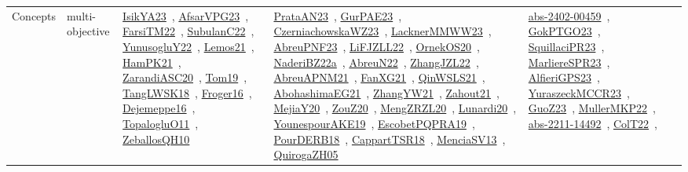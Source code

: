 {\begin{longtable}{lp{3cm}>{\raggedright\arraybackslash}p{6cm}>{\raggedright\arraybackslash}p{6cm}>{\raggedright\arraybackslash}p{8cm}}
Concepts & multi-objective & \href{../works/IsikYA23.pdf}{IsikYA23}~\cite{IsikYA23}, \href{../works/AfsarVPG23.pdf}{AfsarVPG23}~\cite{AfsarVPG23}, \href{../works/FarsiTM22.pdf}{FarsiTM22}~\cite{FarsiTM22}, \href{../works/SubulanC22.pdf}{SubulanC22}~\cite{SubulanC22}, \href{../works/YunusogluY22.pdf}{YunusogluY22}~\cite{YunusogluY22}, \href{../works/Lemos21.pdf}{Lemos21}~\cite{Lemos21}, \href{../works/HamPK21.pdf}{HamPK21}~\cite{HamPK21}, \href{../works/ZarandiASC20.pdf}{ZarandiASC20}~\cite{ZarandiASC20}, \href{../works/Tom19.pdf}{Tom19}~\cite{Tom19}, \href{../works/TangLWSK18.pdf}{TangLWSK18}~\cite{TangLWSK18}, \href{../works/Froger16.pdf}{Froger16}~\cite{Froger16}, \href{../works/Dejemeppe16.pdf}{Dejemeppe16}~\cite{Dejemeppe16}, \href{../works/TopalogluO11.pdf}{TopalogluO11}~\cite{TopalogluO11}, \href{../works/ZeballosQH10.pdf}{ZeballosQH10}~\cite{ZeballosQH10} & \href{../works/PrataAN23.pdf}{PrataAN23}~\cite{PrataAN23}, \href{../works/GurPAE23.pdf}{GurPAE23}~\cite{GurPAE23}, \href{../works/CzerniachowskaWZ23.pdf}{CzerniachowskaWZ23}~\cite{CzerniachowskaWZ23}, \href{../works/LacknerMMWW23.pdf}{LacknerMMWW23}~\cite{LacknerMMWW23}, \href{../works/AbreuPNF23.pdf}{AbreuPNF23}~\cite{AbreuPNF23}, \href{../works/LiFJZLL22.pdf}{LiFJZLL22}~\cite{LiFJZLL22}, \href{../works/OrnekOS20.pdf}{OrnekOS20}~\cite{OrnekOS20}, \href{../works/NaderiBZ22a.pdf}{NaderiBZ22a}~\cite{NaderiBZ22a}, \href{../works/AbreuN22.pdf}{AbreuN22}~\cite{AbreuN22}, \href{../works/ZhangJZL22.pdf}{ZhangJZL22}~\cite{ZhangJZL22}, \href{../works/AbreuAPNM21.pdf}{AbreuAPNM21}~\cite{AbreuAPNM21}, \href{../works/FanXG21.pdf}{FanXG21}~\cite{FanXG21}, \href{../works/QinWSLS21.pdf}{QinWSLS21}~\cite{QinWSLS21}, \href{../works/AbohashimaEG21.pdf}{AbohashimaEG21}~\cite{AbohashimaEG21}, \href{../works/ZhangYW21.pdf}{ZhangYW21}~\cite{ZhangYW21}, \href{../works/Zahout21.pdf}{Zahout21}~\cite{Zahout21}, \href{../works/MejiaY20.pdf}{MejiaY20}~\cite{MejiaY20}, \href{../works/ZouZ20.pdf}{ZouZ20}~\cite{ZouZ20}, \href{../works/MengZRZL20.pdf}{MengZRZL20}~\cite{MengZRZL20}, \href{../works/Lunardi20.pdf}{Lunardi20}~\cite{Lunardi20}, \href{../works/YounespourAKE19.pdf}{YounespourAKE19}~\cite{YounespourAKE19}, \href{../works/EscobetPQPRA19.pdf}{EscobetPQPRA19}~\cite{EscobetPQPRA19}, \href{../works/PourDERB18.pdf}{PourDERB18}~\cite{PourDERB18}, \href{../works/CappartTSR18.pdf}{CappartTSR18}~\cite{CappartTSR18}, \href{../works/MenciaSV13.pdf}{MenciaSV13}~\cite{MenciaSV13}, \href{../works/QuirogaZH05.pdf}{QuirogaZH05}~\cite{QuirogaZH05} & \href{../works/abs-2402-00459.pdf}{abs-2402-00459}~\cite{abs-2402-00459}, \href{../works/GokPTGO23.pdf}{GokPTGO23}~\cite{GokPTGO23}, \href{../works/SquillaciPR23.pdf}{SquillaciPR23}~\cite{SquillaciPR23}, \href{../works/MarliereSPR23.pdf}{MarliereSPR23}~\cite{MarliereSPR23}, \href{../works/AlfieriGPS23.pdf}{AlfieriGPS23}~\cite{AlfieriGPS23}, \href{../works/YuraszeckMCCR23.pdf}{YuraszeckMCCR23}~\cite{YuraszeckMCCR23}, \href{../works/GuoZ23.pdf}{GuoZ23}~\cite{GuoZ23}, \href{../works/MullerMKP22.pdf}{MullerMKP22}~\cite{MullerMKP22}, \href{../works/abs-2211-14492.pdf}{abs-2211-14492}~\cite{abs-2211-14492}, \href{../works/ColT22.pdf}{ColT22}~\cite{ColT22}, 
\end{longtable}}
